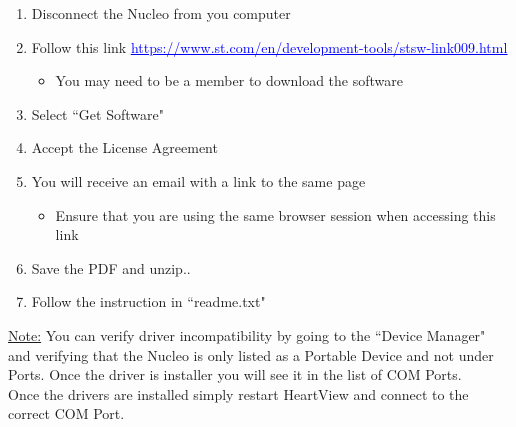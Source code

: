 \documentclass[11pt,fleqn]{book} %
\begin{document}
\begin{enumerate}
	\item Disconnect the Nucleo from you computer
	\item Follow this link \href{https://www.st.com/en/development-tools/stsw-link009.html}{\textcolor{blue}{\underline{https://www.st.com/en/development-tools/stsw-link009.html}}}
	\begin{itemize}
		\item You may need to be a member to download the software
	\end{itemize}
	\item Select ``Get Software"
	\item Accept the License Agreement
	\item You will receive an email with a link to the same page
	\begin{itemize}
		\item Ensure that you are using the same browser session when accessing this link
	\end{itemize}
	\item Save the PDF and unzip..
	\item Follow the instruction in ``readme.txt"\\
\end{enumerate}

\underline{Note:} You can verify driver incompatibility by going to the ``Device Manager" and verifying that the Nucleo is only listed as a Portable Device and not under Ports. Once the driver is installer you will see it in the list of COM Ports.\\

Once the drivers are installed simply restart HeartView and connect to the correct COM Port.





\cite{van_gogh} %
\end{document}
